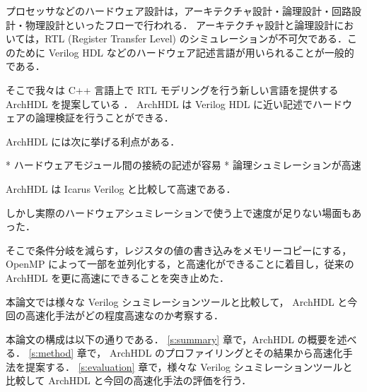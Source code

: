 プロセッサなどのハードウェア設計は，アーキテクチャ設計・論理設計・回路設計・物理設計といったフローで行われる．
アーキテクチャ設計と論理設計においては，RTL (Register Transfer Level)
のシミュレーションが不可欠である．このために
Verilog HDL などのハードウェア記述言語が用いられることが一般的である．

そこで我々は C++ 言語上で RTL モデリングを行う新しい言語を提供する ArchHDL を提案している \cite{satos:archhdl}．
ArchHDL は Verilog HDL に近い記述でハードウェアの論理検証を行うことができる．

ArchHDL には次に挙げる利点がある．

* ハードウェアモジュール間の接続の記述が容易
* 論理シュミレーションが高速

ArchHDL は Icarus Verilog \cite{iverilog}と比較して高速である．

しかし実際のハードウェアシュミレーションで使う上で速度が足りない場面もあった．

そこで条件分岐を減らす，レジスタの値の書き込みをメモリーコピーにする，OpenMP によって一部を並列化する，と高速化ができることに着目し，従来の ArchHDL を更に高速にできることを突き止めた．

本論文では様々な Verilog シュミレーションツールと比較して， ArchHDL と今回の高速化手法がどの程度高速なのか考察する．


本論文の構成は以下の通りである． \ref{s:summary} 章で，ArchHDL の概要を述べる．
\ref{s:method} 章で， ArchHDL のプロファイリングとその結果から高速化手法を提案する．
\ref{s:evaluation} 章で，様々な Verilog シュミレーションツールと比較して ArchHDL と今回の高速化手法の評価を行う．


